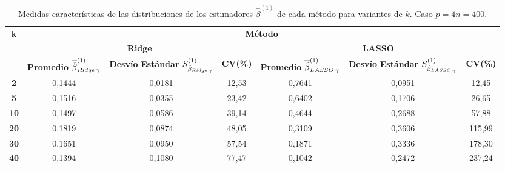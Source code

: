 \documentclass[a4paper,12pt]{report}
\begin{document}
\begin{table}[H]
\centering
\caption{Medidas características de las distribuciones de los estimadores $\hat{\beta}^{(1)}$ de cada método para variantes de $k$. Caso $p=4n=400$.}
\label{tab: sit 3 B 1 med std}
\footnotesize
\begin{tabular}{c|ccc|ccc}
 \multirow{3}{*}[-2em]{\textbf{k}} & \multicolumn{6}{c}{\textbf{Método}} \\[2ex]
 & \multicolumn{3}{c}{\textbf{Ridge}} & \multicolumn{3}{c}{\textbf{LASSO}} \\[2ex]
 & \scriptsize\makecell{\textbf{Promedio} \\ $\overline{\hat{\beta}}_{Ridge \hspace{0.05cm} \gamma}^{(1)}$} & \scriptsize\makecell{\textbf{Desvío} \\ \textbf{Estándar} \\ $S_{\hat{\beta}_{Ridge \hspace{0.05cm} \gamma}}^{(1)}$} & \scriptsize\textbf{CV(\%)} & \scriptsize\makecell{\textbf{Promedio} \\ $\overline{\hat{\beta}}_{LASSO \hspace{0.05cm} \gamma}^{(1)}$} & \scriptsize\makecell{\textbf{Desvío} \\ \textbf{Estándar} \\ $S_{\hat{\beta}_{LASSO \hspace{0.05cm} \gamma}}^{(1)}$} & \scriptsize\textbf{CV(\%)} \\ \hline
\textbf{2}   & 0,1444 & 0,0181 & \hspace{0.05cm} 12,53  & 0,7641 & 0,0951 & \hspace{0.05cm} 12,45 \\
\textbf{5}   & 0,1516 & 0,0355 & \hspace{0.05cm} 23,42 & 0,6402 & 0,1706 & \hspace{0.05cm} 26,65 \\
\textbf{10}  & 0,1497 & 0,0586 & \hspace{0.05cm} 39,14 & 0,4644 & 0,2688 & \hspace{0.05cm} 57,88  \\
\textbf{20}  & 0,1819 & 0,0874 & \hspace{0.05cm} 48,05 & 0,3109 & 0,3606 & 115,99 \\
\textbf{30}  & 0,1651 & 0,0950 & \hspace{0.05cm} 57,54 & 0,1871 & 0,3336 & 178,30 \\
\textbf{40}  & 0,1394 & 0,1080 & \hspace{0.05cm} 77,47 & 0,1042 & 0,2472 & 237,24 \\

\end{tabular}
\end{table}
\end{document}
